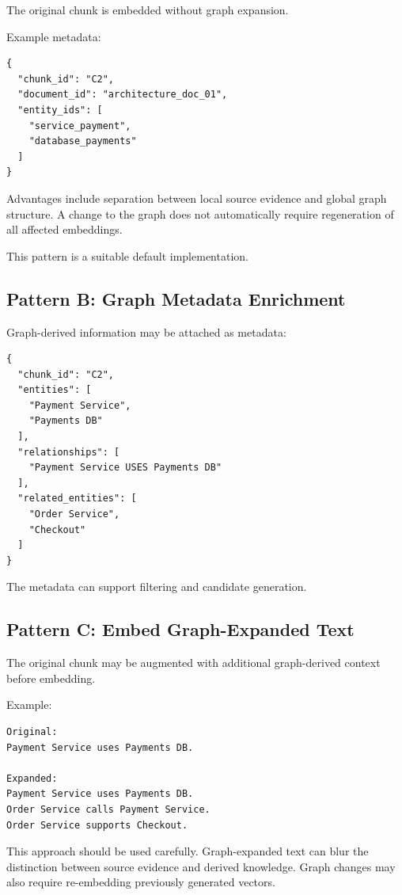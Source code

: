 \documentclass[11pt,a4paper]{article}
\begin{document}
The original chunk is embedded without graph expansion.

Example metadata:

\begin{lstlisting}
{
  "chunk_id": "C2",
  "document_id": "architecture_doc_01",
  "entity_ids": [
    "service_payment",
    "database_payments"
  ]
}
\end{lstlisting}

Advantages include separation between local source evidence and global graph structure. A change to the graph does not automatically require regeneration of all affected embeddings.

This pattern is a suitable default implementation.

\subsection{Pattern B: Graph Metadata Enrichment}

Graph-derived information may be attached as metadata:

\begin{lstlisting}
{
  "chunk_id": "C2",
  "entities": [
    "Payment Service",
    "Payments DB"
  ],
  "relationships": [
    "Payment Service USES Payments DB"
  ],
  "related_entities": [
    "Order Service",
    "Checkout"
  ]
}
\end{lstlisting}

The metadata can support filtering and candidate generation.

\subsection{Pattern C: Embed Graph-Expanded Text}

The original chunk may be augmented with additional graph-derived context before embedding.

Example:

\begin{lstlisting}
Original:
Payment Service uses Payments DB.

Expanded:
Payment Service uses Payments DB.
Order Service calls Payment Service.
Order Service supports Checkout.
\end{lstlisting}

This approach should be used carefully. Graph-expanded text can blur the distinction between source evidence and derived knowledge. Graph changes may also require re-embedding previously generated vectors.
\end{document}
